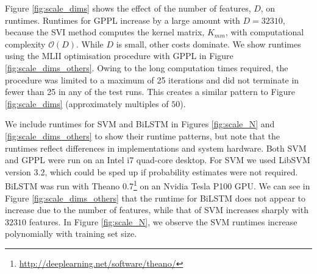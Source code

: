 Figure \ref{fig:scale_dims} shows
the effect of the number of features, $D$, on runtimes.  
Runtimes for GPPL increase by a large amount with $D=32310$,
 because the SVI method computes the kernel matrix, $K_{mm}$, with computational complexity $\mathcal{O}(D)$. While $D$ is small, other
costs dominate.
We show runtimes using the MLII optimisation procedure with GPPL in Figure \ref{fig:scale_dims_others}. 
Owing to the long computation times required, the procedure was limited to
a maximum of 25 iterations and did not terminate in fewer than 25 in any of the test runs. 
This creates a similar pattern to Figure \ref{fig:scale_dims} (approximately multiples of $50$).

We include runtimes for SVM and BiLSTM in Figures \ref{fig:scale_N} and
\ref{fig:scale_dims_others} to show their runtime patterns, but note that the runtimes reflect differences in implementations and system hardware.
Both SVM and GPPL were run on an Intel i7 quad-core desktop. For SVM we used LibSVM version 3.2, which could be sped up if probability estimates were not required.
BiLSTM was run with Theano 0.7\footnote{\url{http://deeplearning.net/software/theano/}} on an Nvidia Tesla P100 GPU. 
We can see in Figure \ref{fig:scale_dims_others} that the runtime for BiLSTM does
not appear to increase due to the number of features, while that of SVM increases sharply with $32310$ features. 
 In Figure \ref{fig:scale_N}, we observe the SVM runtimes increase polynomially with training set size. 

